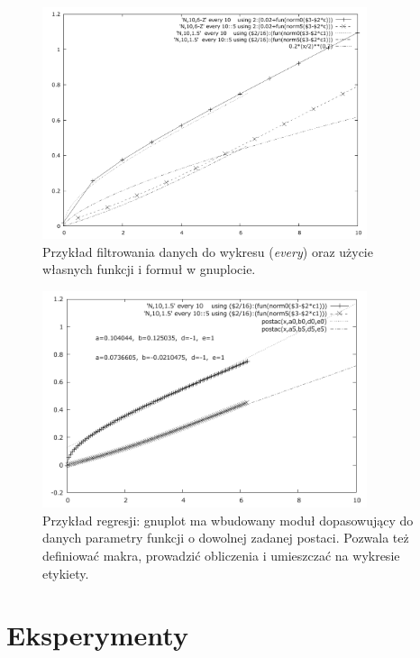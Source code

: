 \documentclass{article}
\begin{document}
\begin{figure}
\begin{center}
\includegraphics[width=0.85\textwidth]{rys_gnuplot_every.pdf}
\end{center}
\caption{Przykład filtrowania danych do wykresu (\emph{every}) oraz użycie własnych funkcji i formuł w gnuplocie.}
\label{fig-every}
\end{figure}

\begin{figure}
\begin{center}
\includegraphics[width=0.85\textwidth]{rys_gnuplot_regr.pdf}
\end{center}
\caption{Przykład regresji: gnuplot ma wbudowany moduł dopasowujący do danych parametry funkcji o dowolnej zadanej postaci. Pozwala też definiować makra, prowadzić obliczenia i umieszczać na wykresie etykiety.}
\label{fig-regr}
\end{figure}

\clearpage %


\section{Eksperymenty}
\label{sec-eksperymenty}
\end{document}
